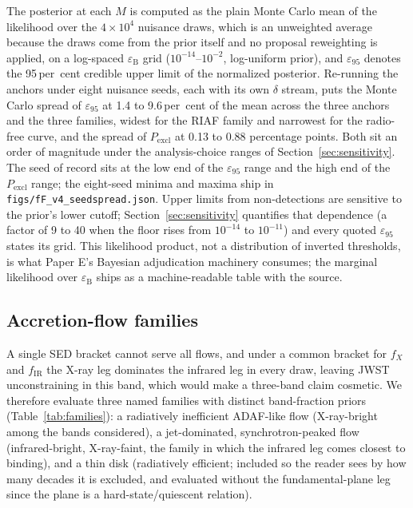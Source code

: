 \documentclass[11pt]{article}
\newcommand{\eps}{\ensuremath{\varepsilon_{\mathrm{B}}}}
\newcommand{\epsl}{\ensuremath{\varepsilon_{95}}}
\begin{document}
The posterior at each $M$ is computed as the plain Monte Carlo mean of the likelihood over the $4\times10^{4}$ nuisance draws, which is an unweighted average because the draws come from the prior itself and no proposal reweighting is applied, on a log-spaced $\eps$ grid ($10^{-14}$--$10^{-2}$, log-uniform prior), and \epsl{} denotes the 95\,per~cent credible upper limit of the normalized posterior. Re-running the anchors under eight nuisance seeds, each with its own $\delta$ stream, puts the Monte Carlo spread of \epsl{} at 1.4 to 9.6\,per~cent of the mean across the three anchors and the three families, widest for the RIAF family and narrowest for the radio-free curve, and the spread of $P_{\mathrm{excl}}$ at 0.13 to 0.88 percentage points. Both sit an order of magnitude under the analysis-choice ranges of Section~\ref{sec:sensitivity}. The seed of record sits at the low end of the \epsl{} range and the high end of the $P_{\mathrm{excl}}$ range; the eight-seed minima and maxima ship in \texttt{figs/fF\_v4\_seedspread.json}. Upper limits from non-detections are sensitive to the prior's lower cutoff; Section~\ref{sec:sensitivity} quantifies that dependence (a factor of 9 to 40 when the floor rises from $10^{-14}$ to $10^{-11}$) and every quoted \epsl{} states its grid. This likelihood product, not a distribution of inverted thresholds, is what Paper E's Bayesian adjudication machinery consumes; the marginal likelihood over $\eps$ ships as a machine-readable table with the source.

\subsection{Accretion-flow families}
\label{sec:families}

A single SED bracket cannot serve all flows, and under a common bracket for $f_{X}$ and $f_{\mathrm{IR}}$ the X-ray leg dominates the infrared leg in every draw, leaving JWST unconstraining in this band, which would make a three-band claim cosmetic. We therefore evaluate three named families with distinct band-fraction priors (Table~\ref{tab:families}): a radiatively inefficient ADAF-like flow (X-ray-bright among the bands considered), a jet-dominated, synchrotron-peaked flow (infrared-bright, X-ray-faint, the family in which the infrared leg comes closest to binding), and a thin disk (radiatively efficient; included so the reader sees by how many decades it is excluded, and evaluated without the fundamental-plane leg since the plane is a hard-state/quiescent relation).
\end{document}
